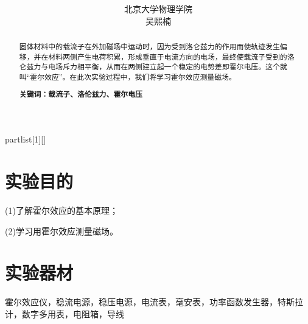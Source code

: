 \documentclass[UTF8]{ctexart}
\author{北京大学物理学院\\
	吴熙楠}
\title{
	\heiti{霍尔效应实验报告}
}
\begin{document}
	\maketitle
	\newtheorem{definition}{定义}[subsection]
	\newtheorem{function}{公式}[subsection]
	\newtheorem{summary}{小结}[subsection]
	\newtheorem{deduction}{推论}[subsection]
	\newtheorem{property}{性质}[subsection]
	\newtheorem{theo}{定理}[subsection]
	\newtheorem{step}{步骤}[subsection]
	\newtheorem{remark}{注记}[subsection]
	\newtheorem{proof}{证明}[subsection]
	\newenvironment{Theorem}[1][]{\par\noindent\textbf{定理}(#1)\quad}{\par}
	\newcommand{\rbra}[1]{\left( #1 \right)}
	\newcommand{\sbra}[1]{\left[ #1 \right]}
	\newcommand{\cbra}[1]{\left\{ #1 \right\}}
	\newcommand{\pbra}[1]{\left< #1 \right>}
	\newcommand{\abs}[1]{\left| #1 \right|}
	\newcommand{\fs}[2]{\displaystyle\frac{#1}{#2}}
	
	\newenvironment{myproof}{{\color{blue}证：}}
	
	\newenvironment{partlist}[1][]
	{\begin{enumerate}[itemsep=0pt, label=(\arabic*), wide, labelindent=\parindent, listparindent=\parindent, #1]}
		{\end{enumerate}}
	\renewcommand{\abstractname}{\Large 摘要\\}
	\begin{abstract}
		{\normalsize 固体材料中的载流子在外加磁场中运动时，因为受到洛仑兹力的作用而使轨迹发生偏移，并在材料两侧产生电荷积累，形成垂直于电流方向的电场，最终使载流子受到的洛仑兹力与电场斥力相平衡，从而在两侧建立起一个稳定的电势差即霍尔电压。这个就叫“霍尔效应”。在此次实验过程中，我们将学习霍尔效应测量磁场。
			
			\textbf{关键词：载流子、洛伦兹力、霍尔电压}}
	\end{abstract}
	
	\newpage
	\renewcommand{\contentsname}{目录} %
	\tableofcontents
	\newpage
	\section{实验目的}
	(1)了解霍尔效应的基本原理；
	\par (2)学习用霍尔效应测量磁场。
	\section{实验器材}
	霍尔效应仪，稳流电源，稳压电源，电流表，毫安表，功率函数发生器，特斯拉计，数字多用表，电阻箱，导线
\end{document}
